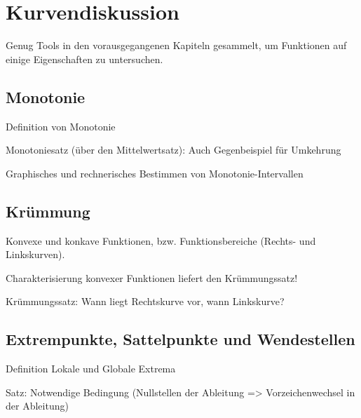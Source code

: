 \chapter{Kurvendiskussion}
Genug Tools in den vorausgegangenen Kapiteln gesammelt, um Funktionen auf einige Eigenschaften zu untersuchen. 

\section{Monotonie}
Definition von Monotonie

\begin{definition}[Monotonie]
    
\end{definition}

Monotoniesatz (über den Mittelwertsatz): Auch Gegenbeispiel für Umkehrung
\begin{theorem}[Monotoniesatz]
    
\end{theorem}

Graphisches und rechnerisches Bestimmen von Monotonie-Intervallen

\section{Krümmung}
Konvexe und konkave Funktionen, bzw. Funktionsbereiche (Rechts- und Linkskurven). 
\begin{definition}
    
\end{definition}

Charakterisierung konvexer Funktionen liefert den Krümmungssatz!

Krümmungssatz: Wann liegt Rechtskurve vor, wann Linkskurve?
\begin{theorem}[Krümmungssatz]
    
\end{theorem}

\section{Extrempunkte, Sattelpunkte und Wendestellen}
Definition Lokale und Globale Extrema

\begin{definition}
    
\end{definition}

Satz: Notwendige Bedingung (Nullstellen der Ableitung => Vorzeichenwechsel in der Ableitung)
\begin{theorem}
    
\end{theorem}

